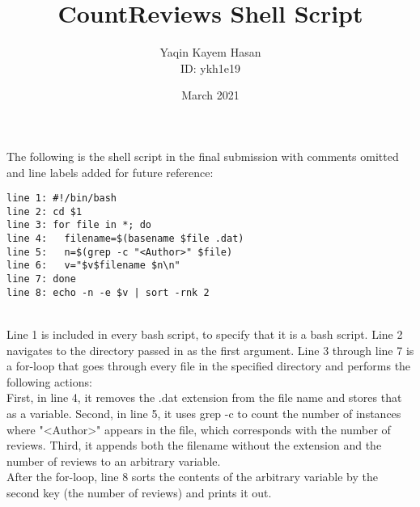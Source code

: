 \documentclass{article}
\title{\textbf{CountReviews Shell Script}}
\author{Yaqin Kayem Hasan \\ ID: ykh1e19}
\date{March 2021}
\begin{document}
\maketitle

\clearpage

The following is the shell script in the final submission with comments omitted and line labels added for future reference: 
\begin{verbatim}
line 1: #!/bin/bash
line 2: cd $1
line 3: for file in *; do
line 4:   filename=$(basename $file .dat)
line 5:   n=$(grep -c "<Author>" $file)
line 6:   v="$v$filename $n\n"
line 7: done
line 8: echo -n -e $v | sort -rnk 2
\end{verbatim}
\\
Line 1 is included in every bash script, to specify that it is a bash script. Line 2 navigates to the directory passed in as the first argument. Line 3 through line 7 is a for-loop that goes through every file in the specified directory and performs the following actions: \\

First, in line 4, it removes the .dat extension from the file name and stores that as a variable. Second, in line 5, it uses grep -c to count the number of instances where "\textless Author\textgreater " appears in the file, which corresponds with the number of reviews. Third, it appends both the filename without the extension and the number of reviews to an arbitrary variable. \\

After the for-loop, line 8 sorts the contents of the arbitrary variable by the second key (the number of reviews) and prints it out. 
\end{document}
